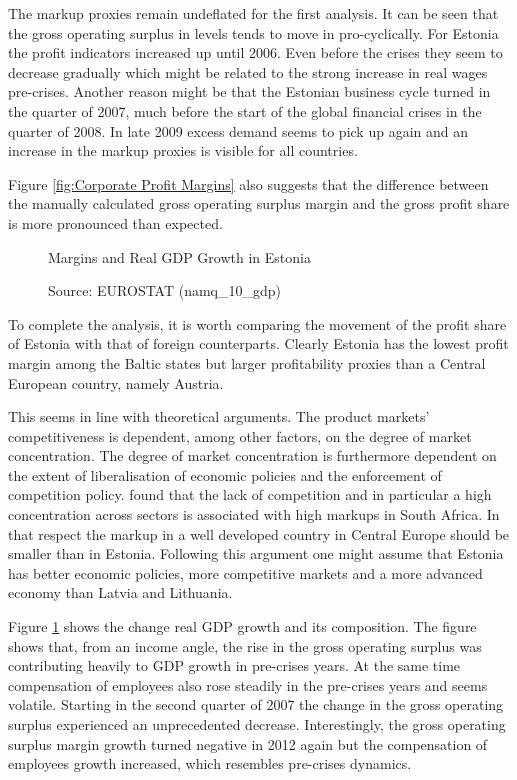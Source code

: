 \documentclass[twoside]{article}
\begin{document}
\begin{multicols}{2}
The markup proxies remain undeflated for the first analysis. It can be seen that the gross operating surplus in levels tends to move in pro-cyclically. For Estonia the profit indicators increased up until 2006. Even before the crises they seem to decrease gradually which might be related to the strong increase in real wages pre-crises. Another reason might be that the Estonian business cycle turned in the  quarter of 2007, much before the start of the global financial crises in the  quarter of 2008. In late 2009 excess demand seems to pick up again and an increase in the markup proxies is visible for all countries. 

Figure \ref{fig:Corporate Profit Margins} also suggests that the difference between the manually calculated gross operating surplus margin and the gross profit share is more pronounced than expected. 


\begin{figure}[H]
\centering
\resizebox{8cm}{!}{}
\vspace*{-10mm}
\caption{Margins and Real GDP Growth in Estonia}\label{fig:Margins and Real GDP Growth in Estonia}
\vspace*{-4mm} %
\caption*{Source: EUROSTAT (namq\_10\_gdp)}
\end{figure}



To complete the analysis, it is worth comparing the movement of the profit share of Estonia with that of foreign counterparts. Clearly Estonia has the lowest profit margin among the Baltic states but larger profitability proxies than a Central European country, namely Austria.

 This seems in line with theoretical arguments. The product markets' competitiveness is dependent, among other factors, on the degree of market concentration. The degree of market concentration is furthermore dependent on the extent of liberalisation of economic policies and the enforcement of competition policy.  \citet{Klein2011South} found that the lack of competition and in particular a high concentration across sectors is associated with high markups in South Africa. In that respect the markup in a well developed country in Central Europe should be smaller than in Estonia. Following this argument one might assume that Estonia has better economic policies, more competitive markets and a more advanced economy than Latvia and Lithuania. 


Figure \ref{fig:Margins and Real GDP Growth in Estonia} shows the change real GDP growth and its composition. The figure shows that, from an income angle, the rise in the gross operating surplus was contributing heavily to GDP growth in pre-crises years. At the same time compensation of employees also rose steadily in the pre-crises years and seems volatile. Starting in the second quarter of 2007 the change in the gross operating surplus experienced an unprecedented decrease. Interestingly, the gross operating surplus margin growth turned negative in 2012 again but the compensation of employees growth increased, which resembles pre-crises dynamics. 



\end{multicols}
\end{document}
